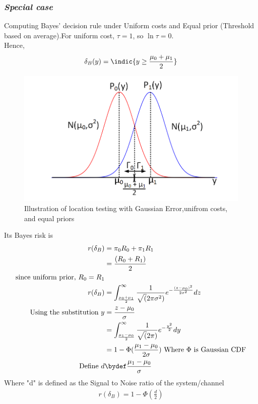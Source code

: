 \documentclass[12pt]{report}
\begin{document}
\begin{itemize}
\begin{exmp}
\subsubsection{\em Special case}  Computing Bayes' decision rule under Uniform costs and Equal prior (Threshold based on average).For uniform cost, $\tau=1$, so $\ln\tau=0$.\\
Hence,
\begin{align}
\delta_B(y) = \indic{y \geq \frac{\mu_0+\mu_1}{2}}
\end{align}

\begin{figure}[h]
\centering
\includegraphics[scale=0.5]{Figures/Gaussian}
\caption{Illustration of location testing with Gaussian Error,unifrom costs, and equal priors}
\label{fig:Gaussian}
\end{figure}




Its Bayes risk is 
\begin{align*}
r(\delta_B)&= \pi_0 R_0+\pi_1 R_1 \\
&=\frac{(R_0+R_1)}{2}\\
\text{since uniform prior, }
R_0 = R_1\\
r(\delta_B) &= \int_{\frac{\mu_0+\mu_1}{2}}^{\infty}{\frac{1}{\sqrt(2 \pi {\sigma}^2)}}e^{-\frac{(z-\mu_0)^2}{2 {\sigma}^2}} dz\\
\text{Using the substitution    }
y&=\frac{z-\mu_0}{\sigma}\\
 &= \int_{\frac{\mu_1-\mu_0}{2}}^{\infty}{\frac{1}{\sqrt(2 \pi)}e^{-\frac{y^2}{2 }}} dy \\
&=1-\Phi{(\frac{\mu_1-\mu_0}{2\sigma})} 
\text{   Where $\Phi$ is Gaussian CDF}\\
\text{Define }
d &\bydef \frac{\mu_1-\mu_0}{\sigma}\\
\end{align*}
   Where "d" is defined as the Signal to Noise ratio of the system/channel \\
\begin{align}
r(\delta_B) = 1-\Phi{(\frac{d}{2})}
\end{align}


\end{exmp}
\end{itemize}
\end{document}
